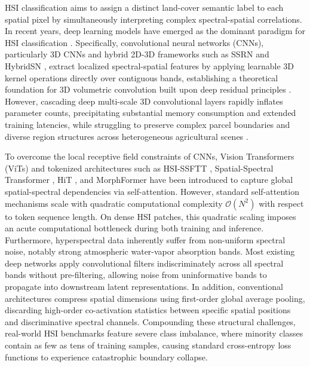 \documentclass[manuscript,screen,review]{acmart}
\begin{document}
HSI classification aims to assign a distinct land-cover semantic label to each spatial pixel by simultaneously interpreting complex spectral-spatial correlations. In recent years, deep learning models have emerged as the dominant paradigm for HSI classification \cite{chen2014deep, zhao2016spectral}. Specifically, convolutional neural networks (CNNs), particularly 3D CNNs and hybrid 2D-3D frameworks such as SSRN \cite{zhong2017spectral} and HybridSN \cite{roy2020hybridsn}, extract localized spectral-spatial features by applying learnable 3D kernel operations directly over contiguous bands, establishing a theoretical foundation for 3D volumetric convolution \cite{ben2018deep} built upon deep residual principles \cite{he2016deep}. However, cascading deep multi-scale 3D convolutional layers \cite{he2018multi} rapidly inflates parameter counts, precipitating substantial memory consumption and extended training latencies, while struggling to preserve complex parcel boundaries and diverse region structures across heterogeneous agricultural scenes \cite{zhang2018diverse}.

To overcome the local receptive field constraints of CNNs, Vision Transformers (ViTs) \cite{dosovitskiy2020image} and tokenized architectures such as HSI-SSFTT \cite{sun2022spectral}, Spatial-Spectral Transformer \cite{he2021spatial}, HiT \cite{yang2022hyperspectral}, and MorphFormer \cite{roy2023morphformer} have been introduced to capture global spatial-spectral dependencies via self-attention. However, standard self-attention mechanisms scale with quadratic computational complexity $\mathcal{O}(N^2)$ with respect to token sequence length. On dense HSI patches, this quadratic scaling imposes an acute computational bottleneck during both training and inference. Furthermore, hyperspectral data inherently suffer from non-uniform spectral noise, notably strong atmospheric water-vapor absorption bands. Most existing deep networks apply convolutional filters indiscriminately across all spectral bands without pre-filtering, allowing noise from uninformative bands to propagate into downstream latent representations. In addition, conventional architectures compress spatial dimensions using first-order global average pooling, discarding high-order co-activation statistics between specific spatial positions and discriminative spectral channels. Compounding these structural challenges, real-world HSI benchmarks feature severe class imbalance, where minority classes contain as few as tens of training samples, causing standard cross-entropy loss functions to experience catastrophic boundary collapse.
\end{document}
